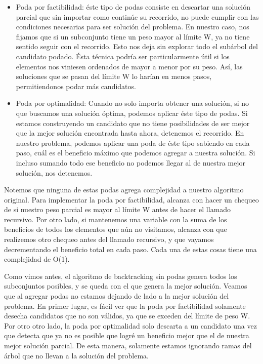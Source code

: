 \begin{itemize}
\item Poda por factibilidad: éste tipo de podas consiste en descartar una solución parcial que sin importar como continúe su recorrido, no puede cumplir con las condiciones necesarias para ser solución del problema. En nuestro caso, nos fijamos que si un subconjunto tiene un peso mayor al límite W, ya no tiene sentido seguir con el recorrido. Esto nos deja sin explorar todo el subárbol del candidato podado. Ésta técnica podría ser particularmente útil si los elementos nos viniesen ordenados de mayor a menor por su peso. Así, las soluciones que se pasan del límite W lo harían en menos pasos, permitiendonos podar más candidatos.
\item Poda por optimalidad: Cuando no solo importa obtener una solución, si no que buscamos una solución óptima, podemos aplicar éste tipo de podas. Si estamos construyendo un candidato que no tiene posibilidades de ser mejor que la mejor solución encontrada hasta ahora, detenemos el recorrido. En nuestro problema, podemos aplicar una poda de éste tipo sabiendo en cada paso, cuál es el beneficio máximo que podemos agregar a nuestra solución. Si incluso sumando todo ese beneficio no podemos llegar al de nuestra mejor solución, nos detenemos.
\end{itemize}

Notemos que ninguna de estas podas agrega complejidad a nuestro algoritmo original. Para implementar la poda por factibilidad, alcanza con hacer un chequeo de si nuestro peso parcial es mayor al límite W antes de hacer el llamado recursivo. Por otro lado, si mantenemos una variable con la suma de los beneficios de todos los elementos que aún no visitamos, alcanza con que realizemos otro chequeo antes del llamado recursivo, y que vayamos decrementando el beneficio total en cada paso. Cada una de estas cosas tiene una complejidad de O(1).

Como vimos antes, el algoritmo de backtracking sin podas genera todos los subconjuntos posibles, y se queda con el que genera la mejor solución. Veamos que al agregar podas no estamos dejando de lado a la mejor solución del problema. En primer lugar, es fácil ver que la poda por factibilidad solamente desecha candidatos que no son válidos, ya que se exceden del límite de peso W. Por otro otro lado, la poda por optimalidad solo descarta a un candidato una vez que detecta que ya no es posible que logré un beneficio mejor que el de nuestra mejor solución parcial. De esta manera, solamente estamos ignorando ramas del árbol que no llevan a la solución del problema.



